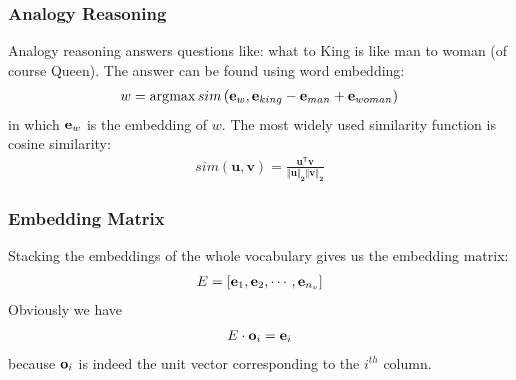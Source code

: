 \subsubsection{Analogy Reasoning}
Analogy reasoning answers questions like: what to King is like man to woman (of course Queen). The answer can be found using word embedding:
\begin{align*}
  w=\operatorname*{\arg\!\max} sim\left(\mathbf{e}_{w}, \mathbf{e}_{king} - \mathbf{e}_{man} + \mathbf{e}_{woman}\right)
\end{align*}
in which $\mathbf{e}_{w}$ is the embedding of $w$. The most widely used similarity function is cosine similarity: 
\begin{align*}
  sim\mathbf{(u, v)=\frac{u^{\mathsf{T}}v}{\Vert u\Vert_2\Vert v\Vert_2}}
\end{align*}
\subsubsection{Embedding Matrix}
Stacking the embeddings of the whole vocabulary gives us the embedding matrix:
\begin{align*}
  E=\left[\mathbf{e}_{1}, \mathbf{e}_{2}, \cdots, \mathbf{e}_{n_v}\right]
\end{align*}
Obviously we have
\begin{align*}
  E\cdot \mathbf{o}_{i}=\mathbf{e}_{i}
\end{align*}
because $\mathbf{o}_{i}$ is indeed the unit vector corresponding to the $i^{th}$ column.
